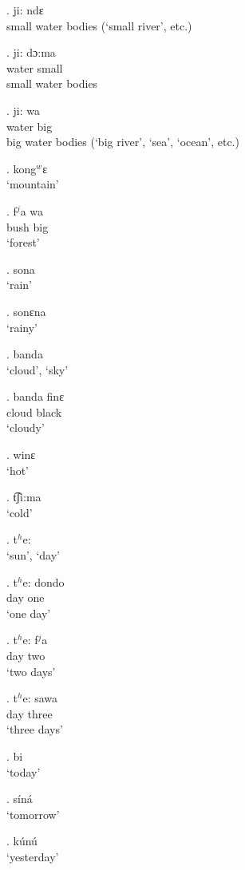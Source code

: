 \documentclass{assets/fieldnotes}
\begin{document}
    \ex. ji: ndɛ\\
        small water bodies (`small river', etc.)

    \exg. ji: dɔ:ma\\
        water small\\
        small water bodies
    
    \exg. ji: wa\\
        water big\\
        big water bodies (`big river', `sea', `ocean', etc.)
        
    \ex. kong$^w$ɛ\\
        `mountain'
           
    \exg. f$^j$a wa\\
        bush big\\
        `forest'

    \ex. sona\\
        `rain'

    \ex. sonɛna\\
        `rainy'
        
    \ex. banda\\
        `cloud', `sky'

    \exg. banda finɛ\\
        cloud black\\
        `cloudy'

    \ex. winɛ\\
        `hot'
        
    \ex. t͡ʃi:ma\\
        `cold'

    \ex. t$^h$e:\\
        `sun', `day'
        
    \exg. t$^h$e: dondo\\
        day one\\
        `one day'

    \exg. t$^h$e: f$^j$a\\
        day two\\
        `two days'

    \exg. t$^h$e: sawa\\
        day three\\
        `three days'

    \ex. bi\\
        `today'

    \ex. síná\\
        `tomorrow'

    \ex. kúnú\\
        `yesterday'
\end{document}
